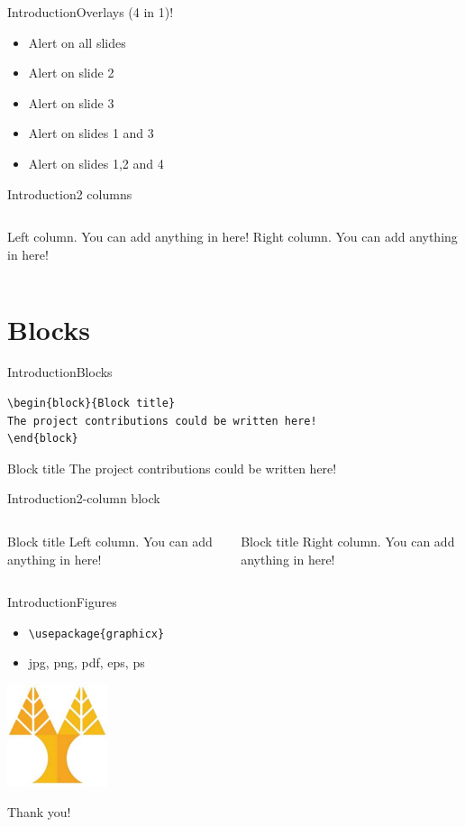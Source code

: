 \documentclass[hyperref={pdfpagelabels=false}]{beamer}
\begin{document}
\begin{frame}{Introduction}{Overlays (4 in 1)!} 
\begin{itemize}
		\item \alert{Alert on all slides}
		\item \alert<2>{Alert on slide 2}
		\item \alert<3>{Alert on slide 3}
		\item \alert<1,3>{Alert on slides 1 and 3}
		\item \alert<-2,4>{Alert on slides 1,2 and 4}
\end{itemize}
\end{frame}


\begin{frame}{Introduction}{2 columns}
\begin{columns}
Left column. You can add anything in here!
Right column. You can add anything in here!
\end{columns}
\end{frame}

\part{Blocks}
\frame{\partpage}

\begin{frame}[fragile]{Introduction}{Blocks}
\begin{verbatim}
\begin{block}{Block title}
The project contributions could be written here!
\end{block}
\end{verbatim}
\begin{block}{Block title}
The project contributions could be written here!
\end{block}
\end{frame}
%

\begin{frame}[fragile]{Introduction}{2-column block}
\begin{columns}
\begin{block}{Block title}
Left column. You can add anything in here!
\end{block}
\begin{block}{Block title}
Right column. You can add anything in here!
\end{block}
\end{columns}
\end{frame}

\begin{frame}[fragile]{Introduction}{Figures}
\begin{itemize}
	\item \verb+\usepackage{graphicx}+
	\item jpg, png, pdf, eps, ps
\end{itemize}
\includegraphics[height=3cm]{./figures/ucylogo.pdf}
\end{frame}

\begin{frame}
    \begin{center}
      Thank you!
    \end{center}
  \end{frame}
\end{document}
